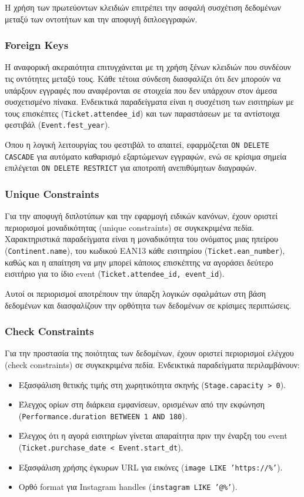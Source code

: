 \documentclass[13pt]{extarticle}
\begin{document}
Η χρήση των πρωτεύοντων κλειδιών επιτρέπει την ασφαλή συσχέτιση δεδομένων μεταξύ των οντοτήτων και την αποφυγή διπλοεγγραφών.

\subsubsection{Foreign Keys}

Η αναφορική ακεραιότητα επιτυγχάνεται με τη χρήση ξένων κλειδιών που συνδέουν τις οντότητες μεταξύ τους. Κάθε τέτοια σύνδεση διασφαλίζει ότι δεν μπορούν να υπάρξουν εγγραφές που αναφέρονται σε στοιχεία που δεν υπάρχουν στον άμεσα συσχετισμένο πίνακα. Ενδεικτικά παραδείγματα είναι η συσχέτιση των εισιτηρίων με τους επισκέπτες (\texttt{Ticket.attendee\_id}) και των παραστάσεων με τα αντίστοιχα φεστιβάλ (\texttt{Event.fest\_year}).

Όπου η λογική λειτουργίας του φεστιβάλ το απαιτεί, εφαρμόζεται \texttt{ON DELETE CASCADE} για αυτόματο καθαρισμό εξαρτώμενων εγγραφών, ενώ σε κρίσιμα σημεία επιλέγεται \texttt{ON DELETE RESTRICT} για αποτροπή ανεπιθύμητων διαγραφών.

\subsubsection{Unique Constraints}

Για την αποφυγή διπλοτύπων και την εφαρμογή ειδικών κανόνων, έχουν οριστεί περιορισμοί μοναδικότητας (unique constraints) σε συγκεκριμένα πεδία. Χαρακτηριστικά παραδείγματα είναι η μοναδικότητα του ονόματος μιας ηπείρου (\texttt{Continent.name}), του κωδικού EAN13 κάθε εισιτηρίου (\texttt{Ticket.ean\_number}), καθώς και η απαίτηση να μην μπορεί κάποιος επισκέπτης να αγοράσει δεύτερο εισιτήριο για το ίδιο event (\texttt{Ticket.attendee\_id, event\_id}).

Αυτοί οι περιορισμοί αποτρέπουν την ύπαρξη λογικών σφαλμάτων στη βάση δεδομένων και διασφαλίζουν την ορθότητα των δεδομένων σε κρίσιμες περιπτώσεις.

\subsubsection{Check Constraints}

Για την προστασία της ποιότητας των δεδομένων, έχουν οριστεί περιορισμοί ελέγχου (check constraints) σε συγκεκριμένα πεδία. Ενδεικτικά παραδείγματα περιλαμβάνουν:
\begin{itemize}
    \item Εξασφάλιση θετικής τιμής στη χωρητικότητα σκηνής (\texttt{Stage.capacity > 0}).
    \item Έλεγχος ορίων στη διάρκεια εμφανίσεων, ορισμένων από την εκφώνηση (\texttt{Performance.duration BETWEEN 1 AND 180}).
    \item Έλεγχος ότι η αγορά εισιτηρίων γίνεται απαραίτητα πριν την έναρξη του event (\texttt{Ticket.purchase\_date < Event.start\_dt}).
    \item Εξασφάλιση χρήσης έγκυρων URL για εικόνες (\texttt{image LIKE 'https://\%'}).
    \item Ορθό format για Instagram handles (\texttt{instagram LIKE '@\%'}).
\end{itemize}
\end{document}
